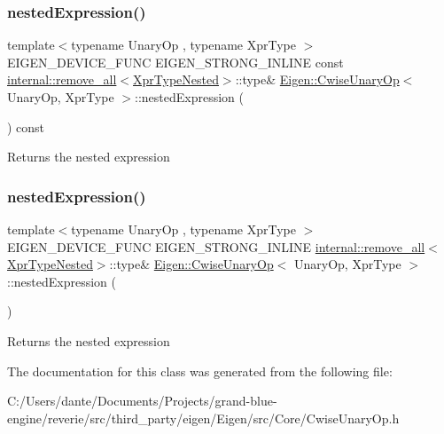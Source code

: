 \subsubsection{\texorpdfstring{nestedExpression()}{nestedExpression()}\hspace{0.1cm}{\footnotesize\ttfamily [1/2]}}
{\footnotesize\ttfamily template$<$typename Unary\+Op , typename Xpr\+Type $>$ \\
E\+I\+G\+E\+N\+\_\+\+D\+E\+V\+I\+C\+E\+\_\+\+F\+U\+NC E\+I\+G\+E\+N\+\_\+\+S\+T\+R\+O\+N\+G\+\_\+\+I\+N\+L\+I\+NE const \mbox{\hyperlink{struct_eigen_1_1internal_1_1remove__all}{internal\+::remove\+\_\+all}}$<$\mbox{\hyperlink{struct_eigen_1_1internal_1_1true__type}{Xpr\+Type\+Nested}}$>$\+::type\& \mbox{\hyperlink{class_eigen_1_1_cwise_unary_op}{Eigen\+::\+Cwise\+Unary\+Op}}$<$ Unary\+Op, Xpr\+Type $>$\+::nested\+Expression (\begin{DoxyParamCaption}{ }\end{DoxyParamCaption}) const\hspace{0.3cm}{\ttfamily [inline]}}

\begin{DoxyReturn}{Returns}
the nested expression 
\end{DoxyReturn}
\mbox{\label{class_eigen_1_1_cwise_unary_op_a2efe6055ea94b65c29dcf1cdcbd7e17e}} 
\subsubsection{\texorpdfstring{nestedExpression()}{nestedExpression()}\hspace{0.1cm}{\footnotesize\ttfamily [2/2]}}
{\footnotesize\ttfamily template$<$typename Unary\+Op , typename Xpr\+Type $>$ \\
E\+I\+G\+E\+N\+\_\+\+D\+E\+V\+I\+C\+E\+\_\+\+F\+U\+NC E\+I\+G\+E\+N\+\_\+\+S\+T\+R\+O\+N\+G\+\_\+\+I\+N\+L\+I\+NE \mbox{\hyperlink{struct_eigen_1_1internal_1_1remove__all}{internal\+::remove\+\_\+all}}$<$\mbox{\hyperlink{struct_eigen_1_1internal_1_1true__type}{Xpr\+Type\+Nested}}$>$\+::type\& \mbox{\hyperlink{class_eigen_1_1_cwise_unary_op}{Eigen\+::\+Cwise\+Unary\+Op}}$<$ Unary\+Op, Xpr\+Type $>$\+::nested\+Expression (\begin{DoxyParamCaption}{ }\end{DoxyParamCaption})\hspace{0.3cm}{\ttfamily [inline]}}

\begin{DoxyReturn}{Returns}
the nested expression 
\end{DoxyReturn}


The documentation for this class was generated from the following file\+:\begin{DoxyCompactItemize}
\item 
C\+:/\+Users/dante/\+Documents/\+Projects/grand-\/blue-\/engine/reverie/src/third\+\_\+party/eigen/\+Eigen/src/\+Core/Cwise\+Unary\+Op.\+h\end{DoxyCompactItemize}
